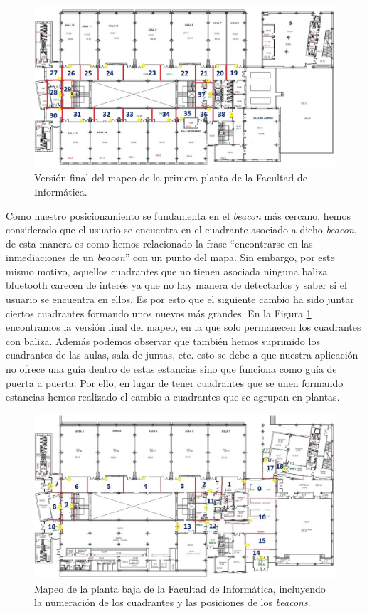 \begin{figure}[t]
	\centering
	\includegraphics[width=1\textwidth]{Imagenes/Descripciondeltrabajo/mapeoPlanta1}
	\caption{Versión final del mapeo de la primera planta de la Facultad de Informática.}
	\label{fig:cuadrantesP1_v3}
\end{figure}


Como nuestro posicionamiento se fundamenta en el \textit{beacon} más cercano, hemos considerado que el usuario se encuentra en el cuadrante asociado a dicho \textit{beacon}, de esta manera es como hemos relacionado la frase ``encontrarse en las inmediaciones de un \textit{beacon}'' con un punto del mapa. Sin embargo, por este mismo motivo, aquellos cuadrantes que no tienen asociada ninguna baliza bluetooth carecen de interés ya que no hay manera de detectarlos y saber si el usuario se encuentra en ellos. Es por esto que el siguiente cambio ha sido juntar ciertos cuadrantes formando unos nuevos más grandes. En la Figura \ref{fig:cuadrantesP1_v3} encontramos la versión final del mapeo, en la que solo permanecen los cuadrantes con baliza. Además podemos observar que también hemos suprimido los cuadrantes de las aulas, sala de juntas, etc. esto se debe a que nuestra aplicación no ofrece una guía dentro de estas estancias sino que funciona como guía de puerta a puerta. Por ello, en lugar de tener cuadrantes que se unen formando estancias hemos realizado el cambio a cuadrantes que se agrupan en plantas.

\begin{figure}[t]
	\centering
	\includegraphics[width=1\textwidth]{Imagenes/Descripciondeltrabajo/mapeoPlantaBaja}
	\caption{Mapeo de la planta baja de la Facultad de Informática, incluyendo la numeración de los cuadrantes y las posiciones de los \textit{beacons}.}
	\label{fig:cuadrantesPbaja}
\end{figure}

